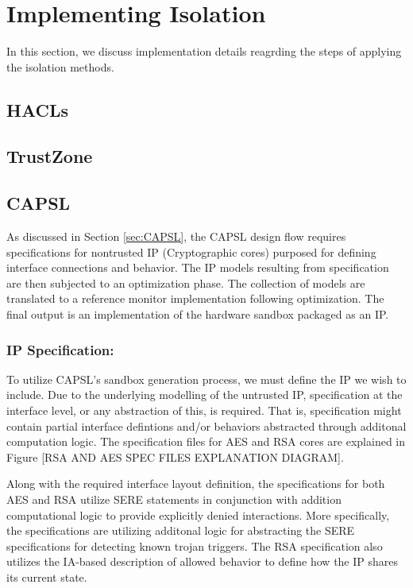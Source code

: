 \documentclass[sigconf]{acmart}
\theoremstyle{plain}
\theoremstyle{remark}
\begin{document}
\section{Implementing Isolation} \label{sec:Implementation}
In this section, we discuss implementation details reagrding the steps of applying the isolation methods.

\subsection{HACLs}

\subsection{TrustZone}

\subsection{CAPSL}

As discussed in Section \ref{sec:CAPSL}, the CAPSL design flow requires specifications for nontrusted IP (Cryptographic cores) purposed for defining interface connections and behavior. The IP models resulting from specification are then subjected to an optimization phase. The collection of models are translated to a reference monitor implementation following optimization. The final output is an implementation of the hardware sandbox packaged as an IP.

\subsubsection{IP Specification:}

To utilize CAPSL's sandbox generation process, we must define the IP we wish to include. Due to the underlying modelling of the untrusted IP, specification at the interface level, or any abstraction of this, is required. That is, specification might contain partial interface defintions and/or behaviors abstracted through additonal computation logic. The specification files for AES and RSA cores are explained in Figure [RSA AND AES SPEC FILES EXPLANATION DIAGRAM].

Along with the required interface layout definition, the specifications for both AES and RSA utilize SERE statements in conjunction with addition computational logic to provide explicitly denied interactions. More specifically, the specifications are utilizing additonal logic for abstracting the SERE specifications for detecting known trojan triggers. The RSA specification also utilizes the IA-based description of allowed behavior to define how the IP shares its current state.
\end{document}
